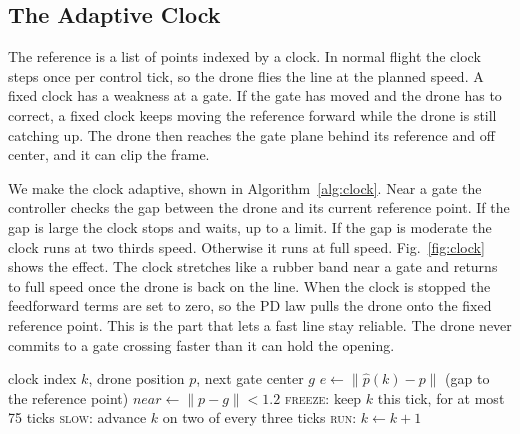 \documentclass[conference]{IEEEtran}
\begin{document}
\subsection{The Adaptive Clock}
\label{sec:clock}
The reference is a list of points indexed by a clock. In normal flight the clock steps once per control tick, so the drone flies the line at the planned speed. A fixed clock has a weakness at a gate. If the gate has moved and the drone has to correct, a fixed clock keeps moving the reference forward while the drone is still catching up. The drone then reaches the gate plane behind its reference and off center, and it can clip the frame.

We make the clock adaptive, shown in Algorithm~\ref{alg:clock}. Near a gate the controller checks the gap between the drone and its current reference point. If the gap is large the clock stops and waits, up to a limit. If the gap is moderate the clock runs at two thirds speed. Otherwise it runs at full speed. Fig.~\ref{fig:clock} shows the effect. The clock stretches like a rubber band near a gate and returns to full speed once the drone is back on the line. When the clock is stopped the feedforward terms are set to zero, so the PD law pulls the drone onto the fixed reference point. This is the part that lets a fast line stay reliable. The drone never commits to a gate crossing faster than it can hold the opening.

\begin{algorithm}[t]
\caption{Adaptive clock update (one control tick)}
\label{alg:clock}
\begin{algorithmic}[1]
\REQUIRE clock index $k$, drone position $p$, next gate center $g$
\STATE $e \leftarrow \lVert \hat{p}(k) - p \rVert$ \quad (gap to the reference point)
\STATE $\mathit{near} \leftarrow \lVert p - g \rVert < 1.2$
    \STATE \textsc{freeze}: keep $k$ this tick, for at most 75 ticks
    \STATE \textsc{slow}: advance $k$ on two of every three ticks
\ELSE
    \STATE \textsc{run}: $k \leftarrow k + 1$
\ENDIF
\end{algorithmic}
\end{algorithm}
\end{document}
